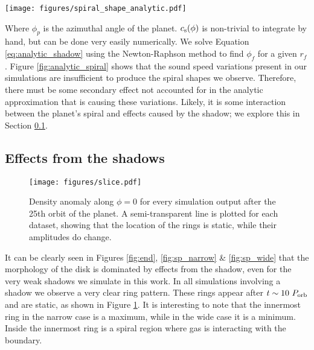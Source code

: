 \documentclass[twocolumn]{aastex631}
\begin{document}
\begin{figure*}
    \centering
    \texttt{[image: figures/spiral\_shape\_analytic.pdf]}
    \caption{
        Analytic spiral solutions for a variety of shadows. Here we consider both the narrow and wide cases for multiple values of $h$.
        The $h=0.9$ case which we simulate numerically very nearly matches the shadowless case, shown in black. In order to get
        variations similar to those seen in our simulations we have to set $h$ to be much less than 1. The region near the planet
        has been cut out because the analytic treatment is not valid there. {\bf Left:} Location of spiral peaks. {\bf Right:}
        $\zeta$ as a function of radius. Note that the pitch angle here never exceeds the pitch angle in the control case.
    }
    \label{fig:analytic_spiral}
\end{figure*}

Where $\phi_p$ is the azimuthal angle of the planet.
$c_{\rm s}(\phi)$ is non-trivial to integrate by hand, but can be done very easily numerically. We solve Equation \ref{eq:analytic_shadow}
using the Newton-Raphson method to find $\phi_f$ for a given $r_f$. Figure \ref{fig:analytic_spiral} shows that the sound speed variations
present in our simulations are insufficient to produce the spiral shapes we observe. Therefore, there must be some secondary effect not accounted for
in the analytic approximation that is causing these variations. Likely, it is some interaction between the planet's spiral and effects caused by the
shadow; we explore this in Section \ref{subsec:effect_shadow}.

\subsection{Effects from the shadows}
\label{subsec:effect_shadow}

\begin{figure}
    \centering
    \texttt{[image: figures/slice.pdf]}
    \caption{
        Density anomaly along $\phi = 0$ for every simulation output after the 25th orbit of the planet. A semi-transparent line
        is plotted for each dataset, showing that the location of the rings is static, while their amplitudes do change.
    }
    \label{fig:slice}
\end{figure}

It can be clearly seen in Figures \ref{fig:end}, \ref{fig:sp_narrow} \& \ref{fig:sp_wide} that the morphology of the disk is dominated
by effects from the shadow, even for the very weak shadows we simulate in this work. In all simulations involving a shadow we observe a very clear
ring pattern. These rings appear after $t\sim10~P_{\rm orb}$ and are static, as shown in Figure \ref{fig:slice}. It is interesting to note that
the innermost ring in the narrow case is a maximum, while in the wide case it is a minimum. Inside the innermost ring is a spiral region where gas
is interacting with the boundary.
\end{document}
